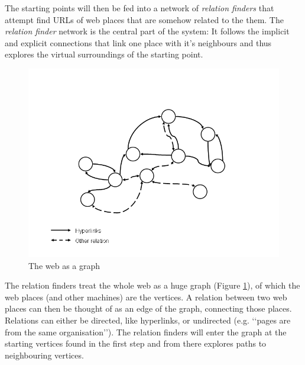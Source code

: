 \documentclass[a4paper]{danarticle}
\theoremstyle{remark}
\begin{document}
      The starting points will then be fed into a network of \textit{relation 
      finders} that attempt find URLs of web places that are somehow related to 
      the them. The \textit{relation finder} network is the central part of the 
      system: It follows the implicit and explicit connections that link one 
      place with it's neighbours and thus explores the virtual surroundings of 
      the starting point. 
      
      \begin{figure}[ht]
        \centering
        \includegraphics[width=12cm]{webgraph}
        \caption{The web as a graph}
        \label{webgraph}
      \end{figure}
      The relation finders treat the whole web as a huge graph (Figure
      \ref{webgraph}), of
      which the web places (and other machines) are the vertices. A relation
      between two web places can then be thought of as an edge of the graph,
      connecting those places. Relations can either be directed, like
      hyperlinks, or undirected (e.g. \lq\lq pages are from the same
      organisation\rq\rq). 
      The relation finders will enter the graph at the
      starting vertices found in the first step and from there explores paths to
      neighbouring vertices.
      
\end{document}
